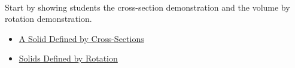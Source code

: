 \documentclass[11pt,fleqn]{article}
\begin{document}
\renewcommand{\headrulewidth}{0pt}
\newcommand{\blank}[1]{\rule{#1}{0.75pt}}
\newcommand{\bc}{\begin{center}}
\newcommand{\ec}{\end{center}}
\renewcommand{\d}{\displaystyle}

\vspace*{-0.7in}

\begin{center}
  \large
  \\
\end{center}
Start by showing students the cross-section demonstration and the volume by rotation demonstration.
\begin{itemize}
	\item \href{https://uaf-math.github.io/calc2/assets/worksheets/F25/M252_2_2_demo_cross_section.html}{A Solid Defined by Cross-Sections}
	\item \href{https://demonstrations.wolfram.com/SolidsOfRevolution/}{Solids Defined by Rotation}
\end{itemize} 
\end{document}
